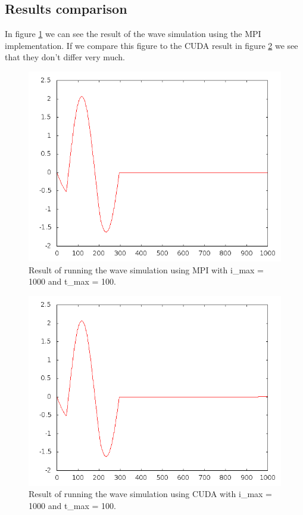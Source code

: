 \documentclass[a4paper]{article}
\begin{document}
	
	\subsection{Results comparison}
		In figure \ref{fig:1000MPI} we can see the result of the wave simulation using the MPI implementation.
		If we compare this figure to the CUDA result in figure \ref{fig:1000CUDA} we see that they don't differ very much.
		\begin{figure}[H]
			\begin{center}
				\includegraphics[scale=0.5]{1000MPI}
			\end{center}
			\caption{Result of running the wave simulation using MPI with i\_max = 1000 and t\_max = 100.}
			\label{fig:1000MPI}
		\end{figure}
		
		\begin{figure}[H]
			\begin{center}
				\includegraphics[scale=0.5]{1000CUDA}
			\end{center}
			\caption{Result of running the wave simulation using CUDA with i\_max = 1000 and t\_max = 100.}
			\label{fig:1000CUDA}
		\end{figure}
		
\end{document}
